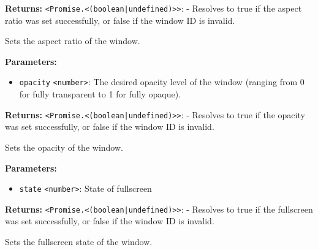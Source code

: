 \documentclass[12pt,a4paper]{article}
\begin{document}
\noindent \textbf{Returns:} \texttt{<Promise.<(boolean|undefined)>>}: - Resolves to \textasciigrave{}true\textasciigrave{} if the aspect ratio was set successfully, or \textasciigrave{}false\textasciigrave{} if the window ID is invalid.

\noindent Sets the aspect ratio of the window.

\vspace{5mm}
\noindent {}


\noindent \textbf{Parameters:}
\begin{itemize}
  \item \texttt{opacity} \texttt{<number>}: The desired opacity level of the window (ranging from \textasciigrave{}0\textasciigrave{} for fully transparent to \textasciigrave{}1\textasciigrave{} for fully opaque).
\end{itemize}

\noindent \textbf{Returns:} \texttt{<Promise.<(boolean|undefined)>>}: - Resolves to \textasciigrave{}true\textasciigrave{} if the opacity was set successfully, or \textasciigrave{}false\textasciigrave{} if the window ID is invalid.

\noindent Sets the opacity of the window.

\vspace{5mm}
\noindent {}


\noindent \textbf{Parameters:}
\begin{itemize}
  \item \texttt{state} \texttt{<number>}: State of fullscreen
\end{itemize}

\noindent \textbf{Returns:} \texttt{<Promise.<(boolean|undefined)>>}: - Resolves to \textasciigrave{}true\textasciigrave{} if the fullscreen was set successfully, or \textasciigrave{}false\textasciigrave{} if the window ID is invalid.

\noindent Sets the fullscreen state of the window.

\vspace{5mm}
\noindent {}
\end{document}
